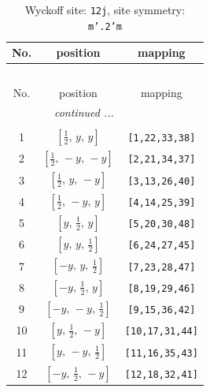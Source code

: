\documentclass[fleqn,8pt]{jsarticle}
\begin{document}
\begin{longtable}{ccc}
\caption{Wyckoff site: {\tt 12j}, site symmetry: {\tt m'.2'm}}
 \\
 \hline \hline
No. & position & mapping \\ \hline \endfirsthead

\multicolumn{2}{l}{\tablename\ \thetable{}} \\
 \hline \hline
No. & position & mapping \\ \hline \endhead

 \hline \hline
\multicolumn{2}{r}{\footnotesize\it continued ...} \\ \endfoot

 \hline \hline
\multicolumn{2}{r}{} \\ \endlastfoot

1 & $\left[ \frac{1}{2},\, y,\, y \right]$ & {\tt [1,22,33,38]} \\ \hline
2 & $\left[ \frac{1}{2},\, - y,\, - y \right]$ & {\tt [2,21,34,37]} \\ \hline
3 & $\left[ \frac{1}{2},\, y,\, - y \right]$ & {\tt [3,13,26,40]} \\ \hline
4 & $\left[ \frac{1}{2},\, - y,\, y \right]$ & {\tt [4,14,25,39]} \\ \hline
5 & $\left[ y,\, \frac{1}{2},\, y \right]$ & {\tt [5,20,30,48]} \\ \hline
6 & $\left[ y,\, y,\, \frac{1}{2} \right]$ & {\tt [6,24,27,45]} \\ \hline
7 & $\left[ - y,\, y,\, \frac{1}{2} \right]$ & {\tt [7,23,28,47]} \\ \hline
8 & $\left[ - y,\, \frac{1}{2},\, y \right]$ & {\tt [8,19,29,46]} \\ \hline
9 & $\left[ - y,\, - y,\, \frac{1}{2} \right]$ & {\tt [9,15,36,42]} \\ \hline
10 & $\left[ y,\, \frac{1}{2},\, - y \right]$ & {\tt [10,17,31,44]} \\ \hline
11 & $\left[ y,\, - y,\, \frac{1}{2} \right]$ & {\tt [11,16,35,43]} \\ \hline
12 & $\left[ - y,\, \frac{1}{2},\, - y \right]$ & {\tt [12,18,32,41]} \\
\end{longtable}
\renewcommand{\arraystretch}{1.2}
\end{document}
